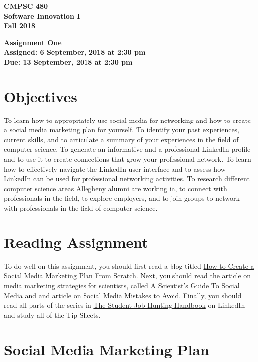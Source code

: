 \documentclass[11pt]{article}
\newcommand{\assignmentduedate}{13 September}
\newcommand{\assignmentassignedate}{ 6 September}
\newcommand{\assignmentnumber}{One}
\newcommand{\labyear}{2018}
\newcommand{\labtime}{2:30 pm}
\newcommand{\assigneddate}{Assigned:  \assignmentassignedate, \labyear{} at \labtime{}}
\newcommand{\duedate}{Due:  \assignmentduedate, \labyear{} at \labtime{}}
\newcommand{\labtitle}[1]
{
  \begin{center}
    \begin{center}
      \bf
      CMPSC 480 \\ Software Innovation I\\
      Fall 2018\\
      \medskip
    \end{center}
    \bf
    #1
  \end{center}
}
\begin{document}
\thispagestyle{empty}

\labtitle{Assignment \assignmentnumber{} \\ \assigneddate{} \\ \duedate{}}

\section*{Objectives}

To learn how to appropriately use social media for networking and how to create a social media marketing plan for yourself. To identify your past experiences, current skills, and to articulate a summary of your experiences in the field of computer science. To generate an informative and a professional LinkedIn profile and to use it to create connections that grow your professional network.  To learn how  to effectively navigate
the LinkedIn user interface and to assess how LinkedIn can be used for professional networking activities. To research different computer science areas Allegheny 
alumni are working in, to connect with professionals in the field, to explore employers, and to  join groups to network with professionals in the field of computer science.

\section*{Reading Assignment}

To do well on this assignment, you
should first read a blog titled \href{https://blog.bufferapp.com/social-media-marketing-plan}{How to Create a Social Media Marketing Plan From Scratch}. Next, you should read the article on media marketing strategies for  scientists, called \href{http://www.sciencemag.org/features/2014/02/scientists-guide-social-media}{A Scientist's Guide To Social Media} and and article on \href{https://www.businessnewsdaily.com/6758-social-media-mistakes.html}{Social Media Mistakes to Avoid}.
Finally, you should  read all parts of the series in  \href{https://students.linkedin.com/}{The Student Job Hunting Handbook} on LinkedIn and study all of the Tip Sheets. 

\section*{Social Media Marketing Plan}
\end{document}

